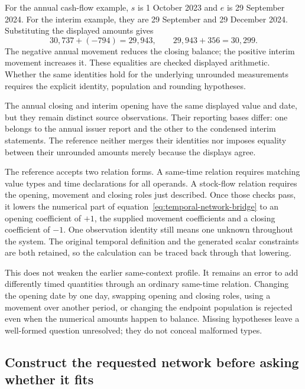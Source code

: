 For the annual cash-flow example, \(s\) is 1 October 2023 and \(e\) is
29 September 2024. For the interim example, they are 29 September and
29 December 2024. Substituting the displayed amounts gives
\begin{equation}
\label{eq:temporal-network-cash-examples}
 30{,}737+(-794)=29{,}943,
 \qquad
 29{,}943+356=30{,}299.
\end{equation}
The negative annual movement reduces the closing balance; the positive interim
movement increases it. These equalities are checked displayed arithmetic.
Whether the same identities hold for the underlying unrounded measurements
requires the explicit identity, population and rounding hypotheses.

The annual closing and interim opening have the same displayed value and date,
but they remain distinct source observations. Their reporting bases differ:
one belongs to the annual issuer report and the other to the condensed interim
statements. The reference neither merges their identities nor imposes equality
between their unrounded amounts merely because the displays agree.

The  reference accepts two relation
forms. A same-time relation requires matching value types and time declarations
for all operands. A stock-flow relation requires the opening, movement and
closing roles just described. Once those checks pass, it lowers the numerical
part of equation~\eqref{eq:temporal-network-bridge} to an opening coefficient
of \(+1\), the supplied movement coefficients and a closing coefficient of
\(-1\). One observation identity still means one unknown throughout the system.
The original temporal definition and the generated scalar constraints are both
retained, so the calculation can be traced back through that lowering.

This does not weaken the earlier same-context profile. It remains an error to
add differently timed quantities through an ordinary same-time relation.
Changing the opening date by one day, swapping opening and closing roles,
using a movement over another period, or changing the endpoint population is
rejected even when the numerical amounts happen to balance. Missing hypotheses
leave a well-formed question unresolved; they do not conceal malformed types.

\subsection{Construct the requested network before asking whether it fits}

